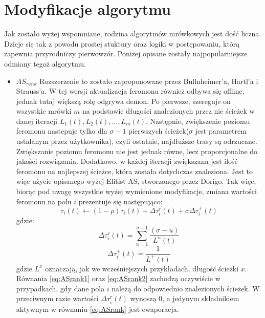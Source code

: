 \documentclass[printmode, openany, oneside, eng]{mgr}
\begin{document}
\section{Modyfikacje algorytmu}\label{sec:algMod}
Jak zostało wyżej wspomniane, rodzina algorytmów mrówkowych jest dość liczna. Dzieje się tak z powodu prostej stuktury oraz logiki w postępowaniu, którą zapewnia przyrodniczy pierwowzór. Poniżej opisane zostały najpopularniejsze odmiany tegoż algorytmu.
\begin{itemize}
\item \textbf{$AS_{rank}$}
\newline Rozszerzenie to zostało zaproponowane przez Bullnheimer'a, Hartl'a i Strauss'a. W tej wersji aktualizacja feromonu również odbywa się offline, jednak tutaj większą rolę odgrywa demon. Po pierwsze, szereguje on wszystkie mrówki $m$ na podstawie długości znalezionych przez nie ścieżek w danej iteracji $L_1(t),L_2(t),...,L_m(t)$. Następnie, zwiększenie poziomu feromonu nastepuje tylko dla $\sigma-1$ pierwszych ścieżek($\sigma$ jest parametrem ustalanym przez użytkownika), czyli ostatnie, najdłuższe trasy są odrzucane. Zwiększanie poziomu feromonu nie jest jednak równe, lecz proporcjonalne do jakości rozwiązania. Dodatkowo, w każdej iteracji zwiększana jest ilość feromonu na najlepszej ścieżce, która została dotychczas znaleziona. Jest to więc użycie opisanego wyżej Elitist AS, stworzonego przez Dorigo. Tak więc, biorąc pod uwagę wszystkie wyżej wymienione modyfikacje, zmiana wartości feromonu na polu $i$ prezentuje się następująco:
\newline
\begin{equation} \label{eq:ASrank}
\tau_{i}(t)  \leftarrow (1-\rho)\tau_{i}(t) + \Delta\tau_{i}^r(t) + \sigma \Delta \tau_i^+(t) 
\end{equation}
\newline
gdzie:
\newline
\begin{equation} \label{eq:ASrank1}
\Delta\tau_{i}^r(t) = \sum_{u=1}^{\sigma-1}\frac{(\sigma-u)}{L^u(t)}
\end{equation}
\begin{equation} \label{eq:ASrank2}
\Delta \tau_i^+(t) = \frac{1}{L^+(t)}
\end{equation}
\newline
gdzie $L^x$ oznaczają, jak we wcześniejszych przykładach, długość ścieżki $x$. Równania \ref{eq:ASrank1} oraz \ref{eq:ASrank2} zachodzą oczywiście w przypadkach, gdy dane pola $i$ należą do odpowiednio znalezionych ścieżek. W przeciwnym razie wartości $\Delta\tau_{i}^r(t)$ wynoszą 0, a jedynym składnikiem aktywnym w równaniu \ref{eq:ASrank} jest ewaporacja.

\end{itemize}
\end{document}
